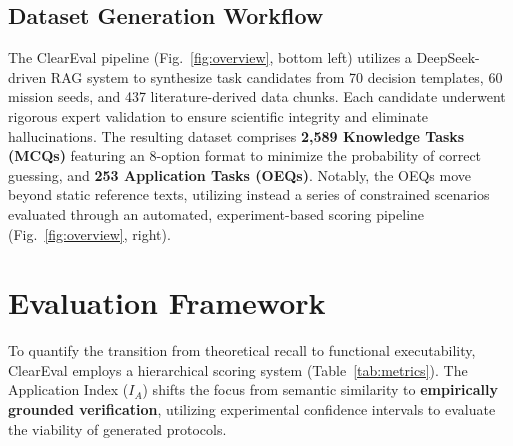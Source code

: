 \documentclass[runningheads]{llncs}
\begin{document}
\subsection{Dataset Generation Workflow}
The ClearEval pipeline (Fig.~\ref{fig:overview}, bottom left) utilizes a DeepSeek-driven RAG system to synthesize task candidates from 70 decision templates, 60 mission seeds, and 437 literature-derived data chunks. Each candidate underwent rigorous expert validation to ensure scientific integrity and eliminate hallucinations. The resulting dataset comprises \textbf{2,589 Knowledge Tasks (MCQs)} featuring an 8-option format to minimize the probability of correct guessing, and \textbf{253 Application Tasks (OEQs)}. Notably, the OEQs move beyond static reference texts, utilizing instead a series of constrained scenarios evaluated through an automated, experiment-based scoring pipeline (Fig.~\ref{fig:overview}, right).

\section{Evaluation Framework}
To quantify the transition from theoretical recall to functional executability, ClearEval employs a hierarchical scoring system (Table~\ref{tab:metrics}). The Application Index ($I_A$) shifts the focus from semantic similarity to \textbf{empirically grounded verification}, utilizing experimental confidence intervals to evaluate the viability of generated protocols.
\end{document}
